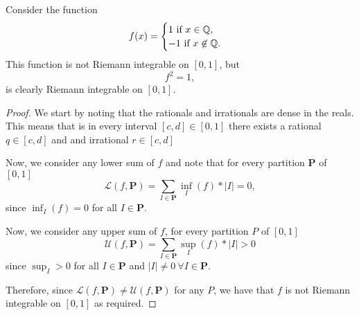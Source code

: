\documentclass[twoside]{article}
\begin{document}
Consider the function
\begin{equation*}
	f(x) =
	\begin{cases}
		1 \text{ if } x \in \mathbb{Q}, \\
		-1 \text{ if } x \not\in \mathbb{Q}.
	\end{cases}
\end{equation*}
This function is not Riemann integrable on $[0, 1]$, but
\begin{equation*}
	f^{2} = 1,
\end{equation*}
is clearly Riemann integrable on $[0, 1]$.

\begin{proof}
	We start by noting that the rationals and irrationals are dense in the reals. This means
	that is in every interval $[c, d] \in [0, 1]$ there exists a rational $q \in [c, d]$ and
	and irrational $r \in [c, d]$

	Now, we consider any lower sum of $f$ and note that for every partition $\bm{P}$ of $[0, 1]$
	\begin{equation*}
		\mathcal{L}(f, \bm{P}) = \sum_{I \in \bm{P}} \inf_{I} (f) * |I| = 0,
	\end{equation*}
	since $\inf_{I} (f) = 0$ for all $I \in \bm{P}$.

	Now, we consider any upper sum of $f$, for every partition $P$ of $[0, 1]$
	\begin{equation*}
		\mathcal{U}(f, \bm{P}) = \sum_{I \in \bm{P}} \sup_{I} (f) * |I| > 0
	\end{equation*}
	since $\sup_{I} > 0$ for all $I \in \bm{P}$ and $|I| \neq 0 \ \forall I \in \bm{P}$.

	Therefore, since $\mathcal{L}(f, \bm{P}) \neq \mathcal{U}(f, \bm{P})$ for any $P$, we have that
	$f$ is not Riemann integrable on $[0, 1]$ as required.
\end{proof}
\end{document}
